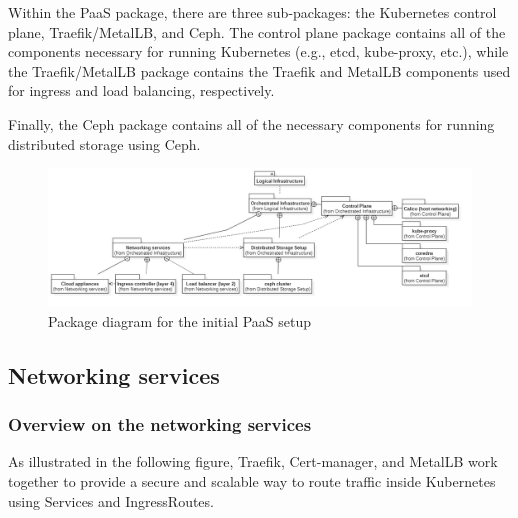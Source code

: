 Within the PaaS package, there are three sub-packages: the Kubernetes control plane, Traefik/MetalLB, and Ceph. The control plane package contains all of the components necessary for running Kubernetes (e.g., etcd, kube-proxy, etc.), while the Traefik/MetalLB package contains the Traefik and MetalLB components used for ingress and load balancing, respectively.

Finally, the Ceph package contains all of the necessary components for running distributed storage using Ceph.

\begin{figure}[H]\centering
\includegraphics[width=1.0\textwidth,angle=00]{assets/f21.png}
\caption{ Package diagram for the initial PaaS setup }
\label{fig:package diagram for the initial PaaS setup}
\end{figure}

\subsection{Networking services}

\subsubsection{Overview on the networking services}

As illustrated in the following figure, Traefik, Cert-manager, and MetalLB work together to provide a secure and scalable way to route traffic inside Kubernetes using Services and IngressRoutes.

